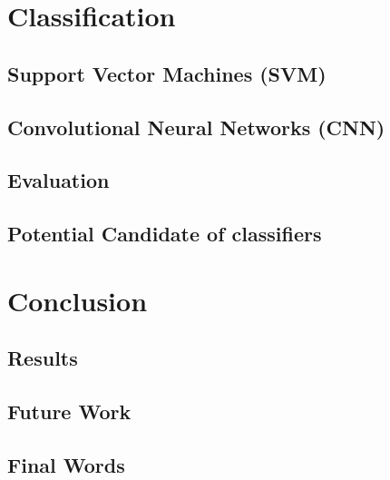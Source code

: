 \documentclass[bsc,logo,twoside,fullspacing,parskip]{infthesis}
\begin{document}
\chapter{Classification}

\section{Support Vector Machines (SVM)}
\section{Convolutional Neural Networks (CNN)}
\section{Evaluation}
\section{Potential Candidate of classifiers}

\chapter{Conclusion}
\section{Results}
\section{Future Work}
\section{Final Words}




\end{document}
